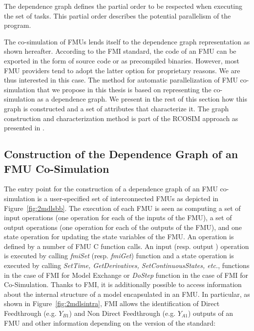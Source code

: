 The dependence graph defines the partial order to be respected when executing the set of tasks. This partial order describes the potential parallelism of the program. %

The co-simulation of FMUs lends itself to the dependence graph representation as shown hereafter. According to the FMI standard, the code of an FMU can be exported in the form of source code or as precompiled binaries. However, most FMU providers tend to adopt the latter option for proprietary reasons. We are thus interested in this case. The method for automatic parallelization of FMU co-simulation that we propose in this thesis is based on representing the co-simulation as a dependence graph. We present in the rest of this section how this graph is constructed and a set of attributes that characterize it. The graph construction and characterization method is part of the RCOSIM approach as presented in \cite{benkhaled:2014}.

\subsection{Construction of the Dependence Graph of an FMU Co-Simulation}

The entry point for the construction of a dependence graph of an FMU co-simulation is a user-specified set of interconnected FMUs as depicted in Figure~\ref{fig:2mdlsbb}. The execution of each FMU is seen as computing a set of input operations (one operation for each of the inputs of the FMU), a set of output operations (one operation for each of the outputs of the FMU), and one state operation for updating the state variables of the FMU. An operation is defined by a number of FMU C function calls. An input (resp. output ) operation is executed by calling \textit{fmiSet} (resp. \textit{fmiGet}) function and a state operation is executed by calling \textit{SetTime, GetDerivatives, SetContinuousStates, etc.}, functions in the case of FMI for Model Exchange or \textit{DoStep} function in the case of FMI for Co-Simulation. Thanks to FMI, it is additionally possible to access information about the internal structure of a model encapsulated in an FMU. In particular, as shown in Figure~\ref{fig:2mdlsintra}, FMI allows the identification of Direct Feedthrough (e.g. $Y_{B1}$) and Non Direct Feedthrough (e.g. $Y_{A1}$) outputs of an FMU and other information depending on the version of the standard:

